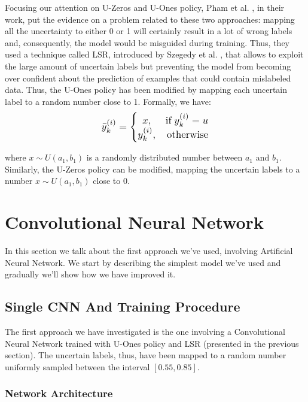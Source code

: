Focusing our attention on U-Zeros and U-Ones policy, Pham et al. \cite{pham2019interpreting}, in their work, put the evidence on a problem related to these two approaches: mapping all the uncertainty to either 0 or 1 will certainly result in a lot of wrong labels and, consequently, the model would be misguided during training. Thus, they used a technique called \ac{LSR}, introduced by Szegedy et al. \cite{lsr}, that allows to exploit the large amount of uncertain labels but preventing the model from becoming over confident about the prediction of examples that could contain mislabeled data.
Thus, the U-Ones policy has been modified by mapping each uncertain label to a random number close to 1. Formally, we have:
\begin{equation}
\scalebox{1.2}{
$
\bar{y}_{k}^{(i)} = \left\{\begin{matrix}
x, & \hfill \textup{if} \; y_{k}^{(i)}  = u\\ 
y_{k}^{(i)}, &\hfill  \textup{otherwise}
\end{matrix}\right.
$
}
    \label{eq:equation_4.1}
\end{equation}

\noindent where $x \sim U(a_{1},b_{1})$ is a randomly distributed number between $a_{1}$ and $b_{1}$. Similarly, the U-Zeros policy can be modified, mapping the uncertain labels to a number $x \sim U(a_{1},b_{1})$ close to 0.

\section{Convolutional Neural Network}
\label{sec:cnn}
In this section we talk about the first approach we've used, involving Artificial Neural Network. We start by describing the simplest model we've used and gradually we'll show how we have improved it.

\subsection{Single CNN And Training Procedure}
\label{sec:single_cnn}
The first approach we have investigated is the one involving a Convolutional Neural Network trained with U-Ones policy and \ac{LSR} (presented in the previous section). The uncertain labels, thus, have been mapped to a random number uniformly sampled between the interval $[0.55,0.85]$.

\vspace{3mm}
\subsubsection{Network Architecture}

